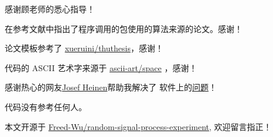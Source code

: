 \documentclass[../main]{subfiles}
\begin{document}
\begin{acknowledgement}

  感谢顾老师的悉心指导！
  
  在参考文献中指出了程序调用的包使用的算法来源的论文。感谢！

  论文模板参考了
  \href{https://github.com/xueruini/thuthesis}{xueruini/thuthesis}，感谢！

  代码的 ASCII 艺术字来源于
  \href{https://www.bootschool.net/ascii-art/space?pageNO=2}{ascii-art/space}
  ，感谢！

  感谢热心的网友\href{https://github.com/jheinen}{Josef Heinen}帮助我解决了
  软件上的\href{https://github.com/jheinen/GR.jl/issues/160}{问题}！

  代码没有参考任何人。

  本文开源于
  \href{https://github.com/Freed-Wu/random-signal-process-experiment}{Freed-Wu/random-signal-process-experiment},
  欢迎留言指正！
\end{acknowledgement}
\end{document}

